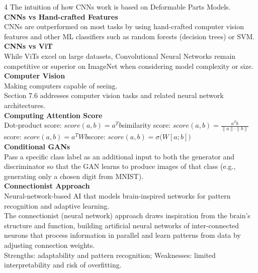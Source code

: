 \documentclass[8pt]{extarticle}
\begin{document}
\begin{multicols}{4}
The intuition of how CNNs work is based on Deformable Parts Models.\\
\vspace{2pt}\textbf{CNNs vs Hand-crafted Features}\\
CNNs are outperformed on most tasks by using hand-crafted computer vision features and other ML classifiers such as random forests (decision trees) or SVM.\\
\vspace{2pt}\textbf{CNNs vs ViT}\\
While ViTs excel on large datasets, Convolutional Neural Networks remain competitive or superior on ImageNet when considering model complexity or size.\\
\vspace{2pt}\textbf{Computer Vision}\\
Making computers capable of seeing.\\
Section 7.6 addresses computer vision tasks and related neural network architectures.\\
\vspace{2pt}\textbf{Computing Attention Score}\\
Dot-product score: $score(a, b) = a^{T} b$\Cosine similarity score: $score(a, b) = \frac{a^{T} b}{\|a\| \cdot \|b\|}$\Bilinear score: $score(a, b) = a^{T} W b$\MLP score: $score(a, b) = \sigma\big( W [a; b] \big)$\\
\vspace{2pt}\textbf{Conditional GANs}\\
Pass a specific class label as an additional input to both the generator and discriminator so that the GAN learns to produce images of that class (e.g., generating only a chosen digit from MNIST).\\
\vspace{2pt}\textbf{Connectionist Approach}\\
Neural-network-based AI that models brain-inspired networks for pattern recognition and adaptive learning.\\
The connectionist (neural network) approach draws inspiration from the brain's structure and function, building artificial neural networks of inter-connected neurons that process information in parallel and learn patterns from data by adjusting connection weights.\\
Strengths: adaptability and pattern recognition; Weaknesses: limited interpretability and risk of overfitting.\\


\end{multicols}
\end{document}
